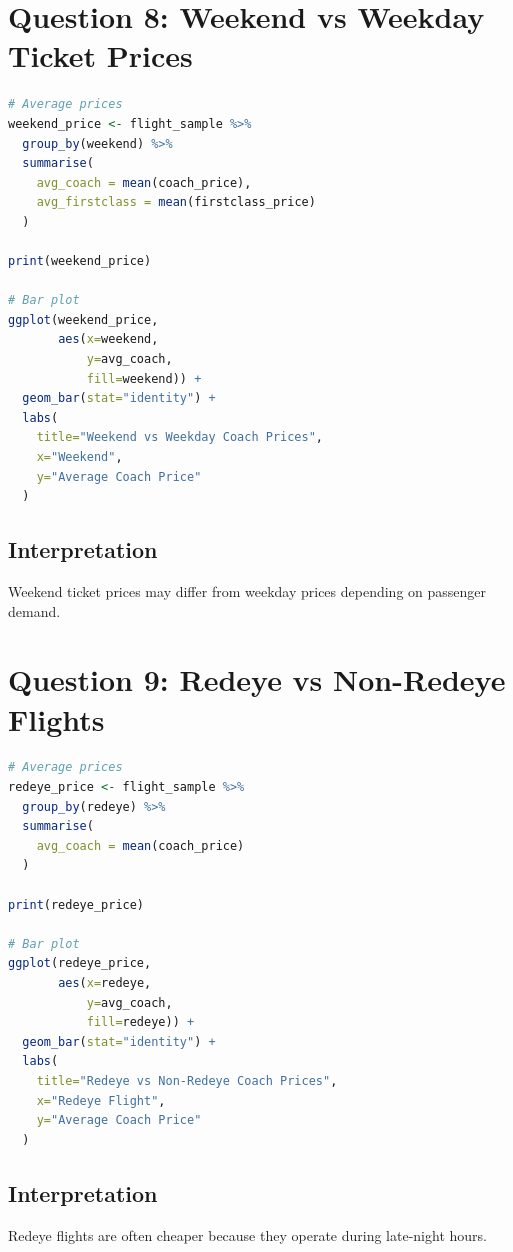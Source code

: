 \documentclass[12pt,a4paper]{article}
\begin{document}
\section{Question 8: Weekend vs Weekday Ticket Prices}

\begin{lstlisting}[language=R, caption=Weekend vs Weekday Analysis]
# Average prices
weekend_price <- flight_sample %>%
  group_by(weekend) %>%
  summarise(
    avg_coach = mean(coach_price),
    avg_firstclass = mean(firstclass_price)
  )

print(weekend_price)

# Bar plot
ggplot(weekend_price,
       aes(x=weekend,
           y=avg_coach,
           fill=weekend)) +
  geom_bar(stat="identity") +
  labs(
    title="Weekend vs Weekday Coach Prices",
    x="Weekend",
    y="Average Coach Price"
  )
\end{lstlisting}

\subsection{Interpretation}
Weekend ticket prices may differ from weekday prices depending on passenger demand.

\section{Question 9: Redeye vs Non-Redeye Flights}

\begin{lstlisting}[language=R, caption=Redeye Flight Analysis]
# Average prices
redeye_price <- flight_sample %>%
  group_by(redeye) %>%
  summarise(
    avg_coach = mean(coach_price)
  )

print(redeye_price)

# Bar plot
ggplot(redeye_price,
       aes(x=redeye,
           y=avg_coach,
           fill=redeye)) +
  geom_bar(stat="identity") +
  labs(
    title="Redeye vs Non-Redeye Coach Prices",
    x="Redeye Flight",
    y="Average Coach Price"
  )
\end{lstlisting}

\subsection{Interpretation}
Redeye flights are often cheaper because they operate during late-night hours.
\end{document}
